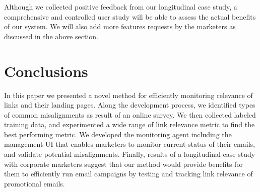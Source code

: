 \documentclass{sigchi}
\begin{document}
Although we collected positive feedback from our longitudinal case study, a comprehensive and controlled user study will be able to assess the actual benefits of our system. We will also add more features requests by the marketers as discussed in the above section. 



\section{Conclusions}
In this paper we presented a novel method for efficiently monitoring relevance of links and their landing pages. Along the development process, we identified types of common misalignments as result of an online survey. We then collected labeled training data, and experimented a wide range of link relevance metric to find the best performing metric. We developed the monitoring agent including the management UI that enables marketers to monitor current status of their emails, and validate potential misalignments. Finally, results of a longitudinal case study with corporate marketers suggest that our method would provide benefits for them to efficiently run email campaigns by testing and tracking link relevance of promotional emails. 


\balance{}



\end{document}
